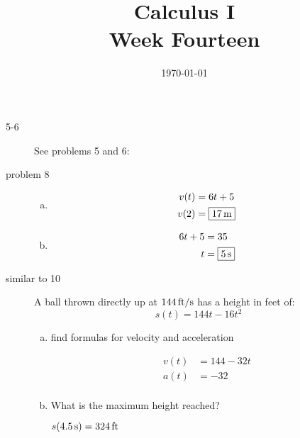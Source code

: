 \documentclass[letterpaper, landscape]{exam}
\author{}
\date{\today}
\title{Calculus I \\ Week Fourteen}
\begin{document}
  \maketitle
  \tableofcontents

  \begin{description}
    \item[5-6] See problems 5 and 6:

    \item[problem 8]
      \begin{enumerate}[(a)]
        \item 
          \begin{align*}
            v(t) & = 6t + 5 \\
            v(2) & = \boxed{ \unit[17]{m} } \\
          \end{align*}

        \item
          \begin{align*}
            6t + 5 & = 35 \\
            t      & = \boxed{ \unit[5]{s} } \\
          \end{align*}
      \end{enumerate}

    \item[similar to 10]
      A ball thrown directly up at $\unit[144]{ft/s}$ has a height in feet of:
      \[
        s(t) = 144t - 16t^2
      \]

      \begin{enumerate}[(a)]
        \item find formulas for velocity and acceleration
          \begin{solution}
            \begin{align*}
              v(t) &= 144 - 32 t \\
              a(t) &= -32 \\
            \end{align*}
          \end{solution}

        \item What is the maximum height reached?
          \begin{solution}
            $s(\unit[4.5]{s}) = \unit[324]{ft}$
          \end{solution}


\end{enumerate}
\end{description}
\end{document}
